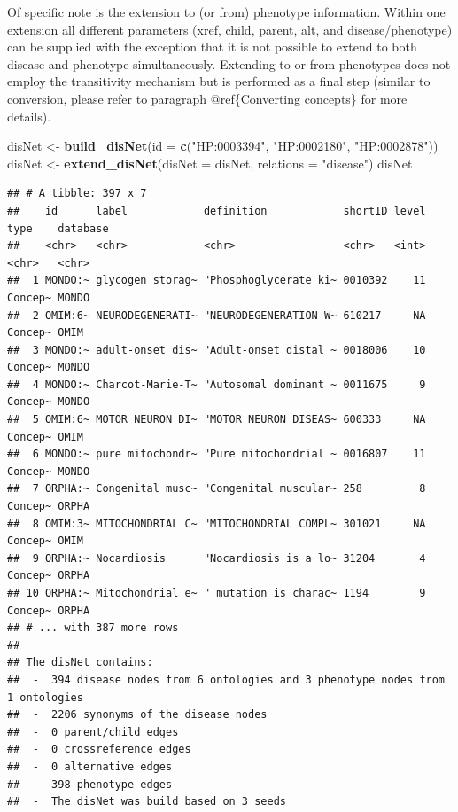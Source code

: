 \documentclass[9pt,a4paper,]{extarticle}
\newenvironment{Shaded}{\begin{snugshade}}{\end{snugshade}}
\newcommand{\DataTypeTok}[1]{\textcolor[rgb]{0.13,0.29,0.53}{#1}}
\newcommand{\KeywordTok}[1]{\textcolor[rgb]{0.13,0.29,0.53}{\textbf{#1}}}
\newcommand{\NormalTok}[1]{#1}
\newcommand{\StringTok}[1]{\textcolor[rgb]{0.31,0.60,0.02}{#1}}
\begin{document}
Of specific note is the extension to (or from) phenotype information. Within one extension all different parameters (xref, child, parent, alt, and disease/phenotype) can be supplied with the exception that it is not possible to extend to both disease and phenotype simultaneously. Extending to or from phenotypes does not employ the transitivity mechanism but is performed as a final step (similar to conversion, please refer to paragraph @ref\{Converting concepts\} for more details).

\begin{Shaded}
\begin{Highlighting}[]
\NormalTok{disNet <-}\StringTok{ }\KeywordTok{build_disNet}\NormalTok{(}\DataTypeTok{id =} \KeywordTok{c}\NormalTok{(}\StringTok{"HP:0003394"}\NormalTok{, }\StringTok{"HP:0002180"}\NormalTok{, }\StringTok{"HP:0002878"}\NormalTok{))}
\NormalTok{disNet <-}\StringTok{ }\KeywordTok{extend_disNet}\NormalTok{(}\DataTypeTok{disNet =}\NormalTok{ disNet, }\DataTypeTok{relations =} \StringTok{"disease"}\NormalTok{)}
\NormalTok{disNet}
\end{Highlighting}
\end{Shaded}

\begin{verbatim}
## # A tibble: 397 x 7
##    id      label            definition            shortID level type    database
##    <chr>   <chr>            <chr>                 <chr>   <int> <chr>   <chr>   
##  1 MONDO:~ glycogen storag~ "Phosphoglycerate ki~ 0010392    11 Concep~ MONDO   
##  2 OMIM:6~ NEURODEGENERATI~ "NEURODEGENERATION W~ 610217     NA Concep~ OMIM    
##  3 MONDO:~ adult-onset dis~ "Adult-onset distal ~ 0018006    10 Concep~ MONDO   
##  4 MONDO:~ Charcot-Marie-T~ "Autosomal dominant ~ 0011675     9 Concep~ MONDO   
##  5 OMIM:6~ MOTOR NEURON DI~ "MOTOR NEURON DISEAS~ 600333     NA Concep~ OMIM    
##  6 MONDO:~ pure mitochondr~ "Pure mitochondrial ~ 0016807    11 Concep~ MONDO   
##  7 ORPHA:~ Congenital musc~ "Congenital muscular~ 258         8 Concep~ ORPHA   
##  8 OMIM:3~ MITOCHONDRIAL C~ "MITOCHONDRIAL COMPL~ 301021     NA Concep~ OMIM    
##  9 ORPHA:~ Nocardiosis      "Nocardiosis is a lo~ 31204       4 Concep~ ORPHA   
## 10 ORPHA:~ Mitochondrial e~ " mutation is charac~ 1194        9 Concep~ ORPHA   
## # ... with 387 more rows
## 
## The disNet contains:
##  -  394 disease nodes from 6 ontologies and 3 phenotype nodes from 1 ontologies 
##  -  2206 synonyms of the disease nodes
##  -  0 parent/child edges
##  -  0 crossreference edges
##  -  0 alternative edges
##  -  398 phenotype edges
##  -  The disNet was build based on 3 seeds
\end{verbatim}
\end{document}
